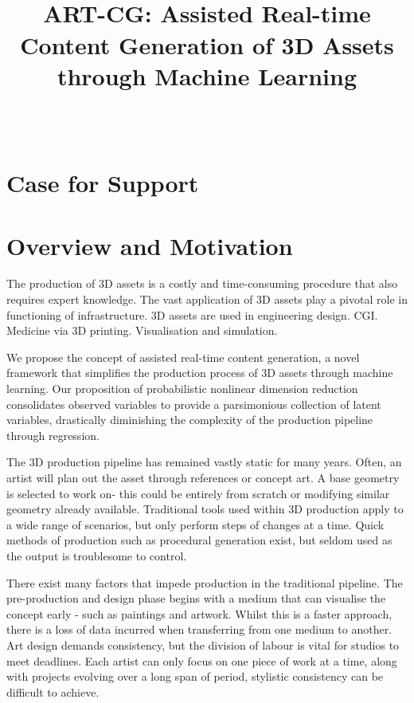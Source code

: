 \documentclass[a4paper, fontsize=15pt, onecolumn]{article} %
\title{
	\vspace{-3.0cm}
	\horrule{0.4pt} \\[0.2cm] %
	\vspace{0.2cm}
	\Large ART-CG: Assisted Real-time Content Generation of 3D Assets through Machine Learning\\
	\horrule{0.4pt} \\[0cm] %
	\vspace{-0.5cm}
}
\date{} %
\numberwithin{equation}{section} %
\numberwithin{figure}{section} %
\numberwithin{table}{section} %
\begin{document}
\maketitle
\thispagestyle{fancy} %

\section*{Case for Support}
\section{Overview and Motivation}
The production of 3D assets is a costly and time-consuming procedure that also requires expert knowledge.
The vast application of 3D assets play a pivotal role in functioning of infrastructure.
3D assets are used in engineering design.
CGI.
Medicine via 3D printing.
Visualisation and simulation.

We propose the concept of assisted real-time content generation, a novel framework that simplifies the production process of 3D assets through machine learning. Our proposition of probabilistic nonlinear dimension reduction consolidates observed variables to provide a parsimonious collection of latent variables, drastically diminishing the complexity of the production pipeline through regression.

The 3D production pipeline has remained vastly static for many years. Often, an artist will plan out the asset through references or concept art. A base geometry is selected to work on- this could be entirely from scratch or modifying similar geometry already available. Traditional tools used within 3D production apply to a wide range of scenarios, but only perform steps of changes at a time. 
Quick methods of production such as procedural generation exist, but seldom used as the output is troublesome to control.

There exist many factors that impede production in the traditional pipeline. The pre-production and design phase begins with a medium that can visualise the concept early - such as paintings and artwork. Whilst this is a faster approach, there is a loss of data incurred when transferring from one medium to another. Art design demands consistency, but the division of labour is vital for studios to meet deadlines. Each artist can only focus on one piece of work at a time, along with projects evolving over a long span of period, stylistic consistency can be difficult to achieve. 
\end{document}
